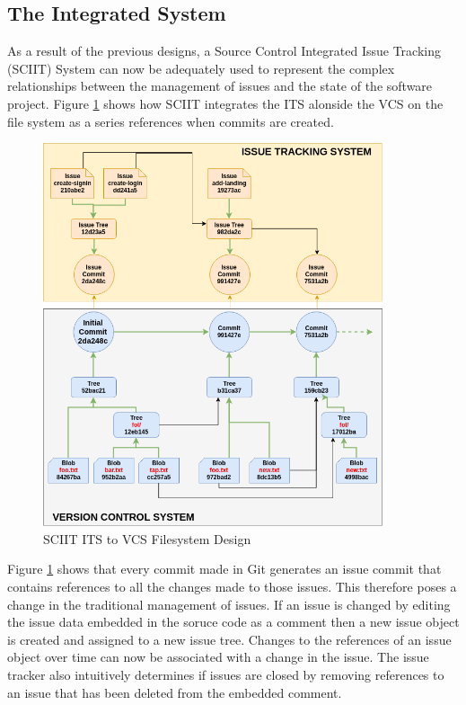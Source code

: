 \documentclass{mproj}
\begin{document}
\subsection{The Integrated System}

As a result of the previous designs, a Source Control Integrated Issue Tracking (SCIIT) System can now be adequately used to represent the complex relationships between the management of issues and the state of the software project. Figure \ref{fig:sciit-filesystem} shows how SCIIT integrates the ITS alonside the VCS on the file system as a series references when commits are created.

\begin{figure}[t]
\caption{SCIIT ITS to VCS Filesystem Design}
\label{fig:sciit-filesystem}
\centering
\includegraphics[width=10cm]{sciit-filesystem}
\end{figure}

Figure \ref{fig:sciit-filesystem} shows that every commit made in Git generates an issue commit that contains references to all the changes made to those issues. This therefore poses a change in the traditional management of issues. If an issue is changed by editing the issue data embedded in the soruce code as a comment then a new issue object is created and assigned to a new issue tree. Changes to the references of an issue object over time can now be associated with a change in the issue. The issue tracker also intuitively determines if issues are closed by removing references to an issue that has been deleted from the embedded comment.
\end{document}
